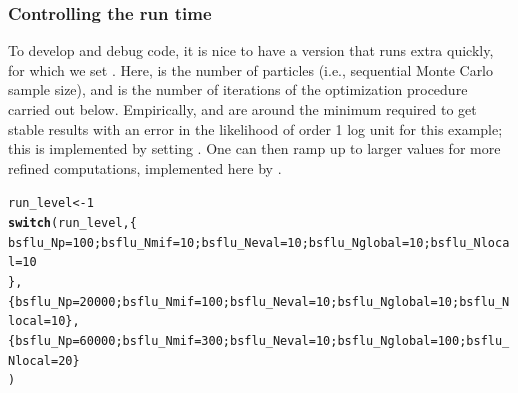 \documentclass{beamer}\usepackage[]{graphicx}\usepackage[]{color}
\makeatletter
\newcommand{\hlnum}[1]{\textcolor[rgb]{0.686,0.059,0.569}{#1}}%
\newcommand{\hlstd}[1]{\textcolor[rgb]{0.345,0.345,0.345}{#1}}%
\newcommand{\hlkwb}[1]{\textcolor[rgb]{0.69,0.353,0.396}{#1}}%
\newcommand{\hlkwd}[1]{\textcolor[rgb]{0.737,0.353,0.396}{\textbf{#1}}}%
\newenvironment{kframe}{%
 \def\at@end@of@kframe{}%
 \ifinner\ifhmode%
  \def\at@end@of@kframe{\end{minipage}}%
  \begin{minipage}{\columnwidth}%
 \fi\fi%
 \def\FrameCommand##1{\hskip\@totalleftmargin \hskip-\fboxsep
 \colorbox{shadecolor}{##1}\hskip-\fboxsep
     \hskip-\linewidth \hskip-\@totalleftmargin \hskip\columnwidth}%
 \MakeFramed {\advance\hsize-\width
   \@totalleftmargin\z@ \linewidth\hsize
   \@setminipage}}%
 {\par\unskip\endMakeFramed%
 \at@end@of@kframe}
\newenvironment{knitrout}{}{} %
\makeatother
\begin{document}
\begin{frame}[fragile]

\frametitle{Controlling the run time}

\bi
\item  To develop and debug code, it is nice to have a version that runs extra quickly, for which we set .  Here,  is the number of particles (i.e., sequential Monte Carlo sample size), and  is the number of iterations of the optimization procedure carried out below. Empirically,  and  are around the minimum required to get stable results with an error in the likelihood of order 1 log unit for this example; this is implemented by setting . One can then ramp up to larger values for more refined computations, implemented here by .
\ei
\begin{knitrout}\small
{}\color{fgcolor}\begin{kframe}
\begin{alltt}
\hlstd{run_level} \hlkwb{<-} \hlnum{1}
\hlkwd{switch}\hlstd{(run_level, \{}
  \hlstd{bsflu_Np}\hlkwb{=}\hlnum{100}\hlstd{; bsflu_Nmif}\hlkwb{=}\hlnum{10}\hlstd{; bsflu_Neval}\hlkwb{=}\hlnum{10}\hlstd{; bsflu_Nglobal}\hlkwb{=}\hlnum{10}\hlstd{; bsflu_Nlocal}\hlkwb{=}\hlnum{10}
  \hlstd{\},}
       \hlstd{\{bsflu_Np}\hlkwb{=}\hlnum{20000}\hlstd{; bsflu_Nmif}\hlkwb{=}\hlnum{100}\hlstd{; bsflu_Neval}\hlkwb{=}\hlnum{10}\hlstd{; bsflu_Nglobal}\hlkwb{=}\hlnum{10}\hlstd{; bsflu_Nlocal}\hlkwb{=}\hlnum{10}\hlstd{\},}
       \hlstd{\{bsflu_Np}\hlkwb{=}\hlnum{60000}\hlstd{; bsflu_Nmif}\hlkwb{=}\hlnum{300}\hlstd{; bsflu_Neval}\hlkwb{=}\hlnum{10}\hlstd{; bsflu_Nglobal}\hlkwb{=}\hlnum{100}\hlstd{; bsflu_Nlocal}\hlkwb{=}\hlnum{20}\hlstd{\}}
\hlstd{)}
\end{alltt}
\end{kframe}
\end{knitrout}

\end{frame}
\end{document}
